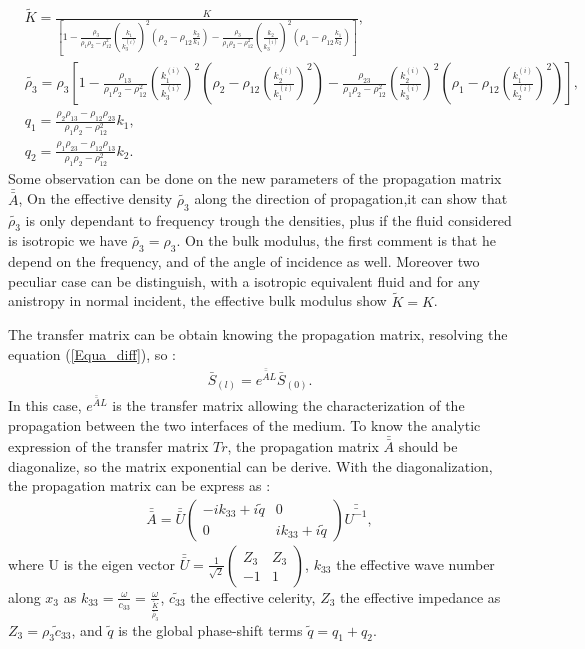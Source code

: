 \documentclass{article}
\begin{document}
    \begin{align}
     &\tilde{K}=\frac{K}{[1-\frac{\rho_3}{\rho_1\rho_2-\rho_{12}^2}(\frac{k_1}{k_3^{(i)}})^2(\rho_2-\rho_{12}\frac{k_2}{k_1})-\frac{\rho_3}{\rho_1\rho_2-\rho_{12}^2}(\frac{k_2}{k_3^{(i)}})^2(\rho_1-\rho_{12}\frac{k_1}{k_2})]}\label{Ktild},\\
     &\tilde{\rho_3}=\rho_3[1-\frac{\rho_{13}}{\rho_1\rho_2-\rho_{12}^2}(\frac{k_1^{(i)}}{k_3^{(i)}})^2(\rho_2-\rho_{12}(\frac{k_2^{(i)}}{k_1^{(i)}})^2)-\frac{\rho_{23}}{\rho_{1}\rho_2-\rho_{12}^2}(\frac{k_2^{(i)}}{k_3^{(i)}})^2(\rho_1-\rho_{12}(\frac{k_1^{(i)}}{k_2^{(i)}})^2)]\label{rho3tild}, \\
	&q_{1}=\frac{\rho_2\rho_{13}-\rho_{12}\rho_{23}}{\rho_1\rho_2-\rho_{12}^2}k_1\label{q1},\\
    &q_{2}= \frac{\rho_1\rho_{23}-\rho_{12}\rho_{13}}{\rho_1\rho_2-\rho_{12}^2}k_2\label{q2}.
          \end{align}
          Some observation can be done on the new parameters of the propagation matrix $\bar{\bar{A}}$, On the effective density $\tilde{\rho_3}$ along the direction of propagation,it can show that $\tilde{\rho_3}$ is only dependant to frequency trough the densities, plus if the fluid considered is isotropic we have $\tilde{\rho_3}=\rho_3$. On the bulk modulus, the first comment is that he depend on the frequency, and of the angle of incidence as well. Moreover two peculiar case can be distinguish, with a isotropic equivalent fluid and for any anistropy in normal incident, the effective bulk modulus show $\tilde{K}=K$. %
          
    The transfer matrix can be obtain knowing the propagation matrix, resolving the equation (\ref{Equa_diff}), so :
    \begin{align}
    \bar{S}_{(l)}=e^{\bar{\bar{A}}L}\bar{S}_{(0)}.\label{PB}
    \end{align}
    In this case, $e^{\bar{\bar{A}}L}$ is the transfer matrix allowing the characterization of the propagation between the two interfaces of the medium.
    To know the analytic expression of the transfer matrix $Tr$, the propagation matrix $\bar{\bar{A}}$ should be diagonalize, so the matrix exponential can be derive.
    With the diagonalization, the propagation matrix can be express as :
     \begin{align}
    \bar{\bar{A}}=\bar{\bar{U}} \begin{pmatrix}
    								-ik_{33}+i\tilde{q} & 0 \\ 0 & ik_{33}+i\tilde{q} 
    							\end{pmatrix} \bar{\bar{U^{-1}}},
    \end{align}
    where U is the eigen vector $\bar{\bar{U}}=\frac{1}{\sqrt{2}}\begin{pmatrix} Z_3 & Z_3 \\ -1 & 1 \end{pmatrix}$, $k_{33}$ the effective wave number along $x_3$ as $k_{33}=\frac{\omega}{c_{33}}=\frac{\omega}{\frac{\tilde{K}}{\tilde{\rho_3}}}$, $\tilde{c_{33}}$ the effective celerity, $Z_3$ the effective impedance as $Z_3=\tilde{\rho_3c_{33}}$, and $\tilde{q}$ is the global phase-shift terms $\tilde{q}=q_1+q_2$.
    
\end{document}
